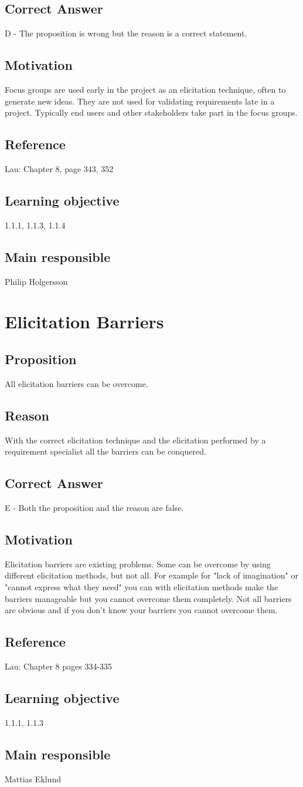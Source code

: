 \documentclass[a4paper]{article}
\begin{document}
\subsection*{Correct Answer}
D - The proposition is wrong but the reason is a correct statement.
\subsection*{Motivation}
Focus groups are used early in the project as an elicitation technique, often to generate new ideas. They are not used for validating requirements late in a project. Typically end users and other stakeholders take part in the focus groups.
\subsection*{Reference}
Lau: Chapter 8, page 343, 352
\subsection*{Learning objective}
1.1.1, 1.1.3, 1.1.4
\subsection*{Main responsible}
Philip Holgersson


\section{Elicitation Barriers}
\subsection*{Proposition}
All elicitation barriers can be overcome.
\subsection*{Reason}
With the correct elicitation technique and the elicitation performed by a requirement specialist all the barriers can be conquered.
\subsection*{Correct Answer}
E - Both the proposition and the reason are false.
\subsection*{Motivation}
Elicitation barriers are existing problems. Some can be overcome by using different elicitation methods, but not all. For example for "lack of imagination" or "cannot express what they need" you can with elicitation methods make the barriers manageable but you cannot overcome them completely. Not all barriers are obvious and if you don't know your barriers you cannot overcome them.
\subsection*{Reference}
Lau: Chapter 8 pages 334-335
\subsection*{Learning objective}
1.1.1, 1.1.3
\subsection*{Main responsible}
Mattias Eklund
\end{document}
